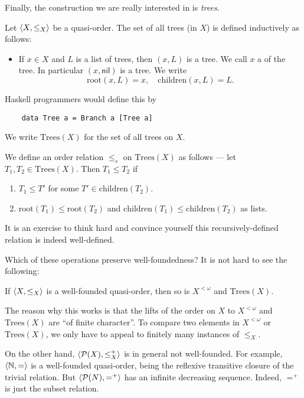 \documentclass[a4paper]{article}
\newcommand\cnil{\mathsf{nil}}
\begin{document}
Finally, the construction we are really interested in is \emph{trees}.
\begin{defi}[Tree]
  Let $\langle X, \leq_X\rangle $ be a quasi-order. The set of all trees (in $X$) is defined inductively as follows:
  \begin{itemize}
    \item If $x \in X$ and $L$ is a list of trees, then $(x, L)$ is a tree. We call $x$ a  of the tree. In particular $(x, \cnil)$ is a tree. We write
      \[
        \mathrm{root}(x, L) = x,\quad \mathrm{children}(x, L) = L.
      \]
  \end{itemize}
  Haskell programmers would define this by
  \begin{verbatim}
    data Tree a = Branch a [Tree a]\end{verbatim}
  We write $\mathrm{Trees}(X)$ for the set of all trees on $X$.

  We define an order relation $\leq_s$ on $\mathrm{Trees}(X)$ as follows --- let $T_1, T_2 \in \mathrm{Trees}(X)$. Then $T_1 \leq T_2$ if
  \begin{enumerate}
    \item $T_1 \leq T'$ for some $T' \in \mathrm{children}(T_2)$.
    \item $\mathrm{root}(T_1) \leq \mathrm{root}(T_2)$ and $\mathrm{children}(T_1) \leq \mathrm{children}(T_2)$ as lists.
  \end{enumerate}
\end{defi}
It is an exercise to think hard and convince yourself this recursively-defined relation is indeed well-defined.

Which of these operations preserve well-foundedness? It is not hard to see the following:
\begin{lemma}
  If $\langle X, \leq_X\rangle$ is a well-founded quasi-order, then so is $X^{<\omega}$ and $\mathrm{Trees}(X)$.
\end{lemma}
The reason why this works is that the lifts of the order on $X$ to $X^{<\omega}$ and $\mathrm{Trees}(X)$ are ``of finite character''. To compare two elements in $X^{<\omega}$ or $\mathrm{Trees}(X)$, we only have to appeal to finitely many instances of $\leq_X$.

On the other hand, $\langle \mathcal{P}(X), \leq_X^+\rangle$ is in general not well-founded. For example, $\langle \mathbb{N}, =\rangle$ is a well-founded quasi-order, being the reflexive transitive closure of the trivial relation. But $\langle \mathcal{P}(N), =^+\rangle$ has an infinite decreasing sequence. Indeed, $=^+$ is just the subset relation.
\end{document}
